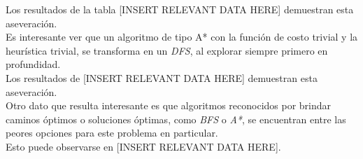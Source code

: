 \documentclass[a4paper,10pt]{article}
\begin{document}
    Los resultados de la tabla [INSERT RELEVANT DATA HERE] demuestran esta aseveración. \\

    Es interesante ver que un algoritmo de tipo A* con la función de costo trivial y la heurística trivial, se transforma en un \textit{DFS}, al explorar siempre 
    primero en profundidad. \\

    Los resultados de [INSERT RELEVANT DATA HERE] demuestran esta aseveración. \\

    Otro dato que resulta interesante es que algoritmos reconocidos por brindar caminos óptimos o soluciones óptimas, como \textit{BFS} o \textit{A*}, se encuentran entre las peores
    opciones para este problema en particular. \\

    Esto puede observarse en [INSERT RELEVANT DATA HERE].\\
\end{document}
